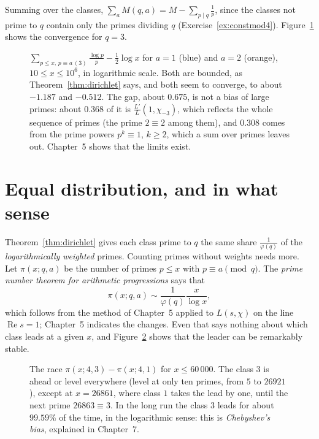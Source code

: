 Summing over the classes, $\sum_aM(q,a)=M-\sum_{p\mid q}\frac1p$, since the classes not prime to $q$ contain only the primes dividing $q$ (Exercise~\ref{ex:constmod4}).
Figure~\ref{fig:mertensprog} shows the convergence for $q=3$.

\begin{figure}[ht]
\centering
{}
\caption{$\sum_{p\le x,\,p\equiv a\,(3)}\frac{\log p}p-\frac12\log x$ for $a=1$ (blue) and $a=2$ (orange), $10\le x\le10^6$, in logarithmic scale. Both are bounded, as
Theorem~\ref{thm:dirichlet} says, and both seem to converge, to about $-1.187$ and $-0.512$. The gap, about $0.675$, is not a bias of large primes: about $0.368$ of it is
$\frac{L'}L(1,\chi_{-3})$, which reflects the whole sequence of primes (the prime $2\equiv2$ among them), and $0.308$ comes from the prime powers $p^k\equiv1$, $k\ge2$, which a sum
over primes leaves out. Chapter~5 shows that the limits exist.}
\label{fig:mertensprog}
\end{figure}

\section{Equal distribution, and in what sense}

Theorem~\ref{thm:dirichlet} gives each class prime to $q$ the same share $\frac1{\varphi(q)}$ of the \emph{logarithmically weighted} primes. Counting primes
without weights needs more. Let $\pi(x;q,a)$ be the number of primes $p\le x$ with $p\equiv a\pmod q$. The \emph{prime number theorem for arithmetic progressions}
says that
\[
\pi(x;q,a)\sim\frac1{\varphi(q)}\frac x{\log x},
\]
which follows from the method of Chapter~5 applied to $L(s,\chi)$ on the line $\operatorname{Re}s=1$; Chapter~5 indicates the changes. Even that says nothing
about which class leads at a given $x$, and Figure~\ref{fig:race} shows that the leader can be remarkably stable.

\begin{figure}[ht]
\centering
{}
\caption{The race $\pi(x;4,3)-\pi(x;4,1)$ for $x\le60\,000$. The class $3$ is ahead or level everywhere (level at only ten primes, from $5$ to $26921$), except at $x=26861$,
where class $1$ takes the lead by one, until the next prime $26863\equiv3$. In the long run the class $3$ leads for about
$99.59\%$ of the time, in the logarithmic sense: this is \emph{Chebyshev's bias}, explained in Chapter~7.}
\label{fig:race}
\end{figure}

